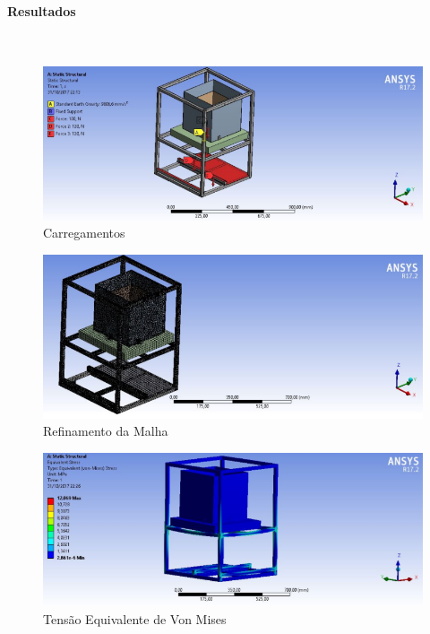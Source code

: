\paragraph*{Resultados}\

\begin{figure}[H]
	\centering
	\includegraphics[]{figuras/carregamentos.png}
	\caption{Carregamentos}
\end{figure}

\begin{figure}[H]
	\centering
	\includegraphics[]{figuras/malharefinada.png}
	\caption{Refinamento da Malha}
\end{figure}

\begin{figure}[H]
	\centering
	\includegraphics[]{figuras/tensaoequivalente.png}
	\caption{Tensão Equivalente de Von Mises}
\end{figure}

